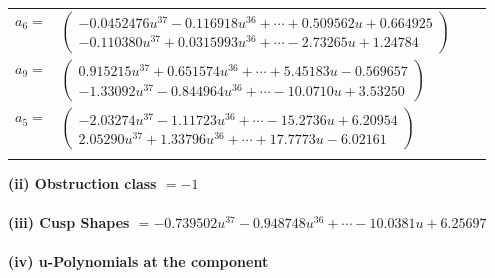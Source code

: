 \documentclass[1p]{elsarticle_modified}
\theoremstyle{definition}
\begin{document}
\begin{tabular}{m{7pt} m{180pt} m{7pt} m{180pt} }
\flushright $a_{6}=$&$\begin{pmatrix}-0.0452476 u^{37}-0.116918 u^{36}+\cdots+0.509562 u+0.664925\\-0.110380 u^{37}+0.0315993 u^{36}+\cdots-2.73265 u+1.24784\end{pmatrix}$ \\
\flushright $a_{9}=$&$\begin{pmatrix}0.915215 u^{37}+0.651574 u^{36}+\cdots+5.45183 u-0.569657\\-1.33092 u^{37}-0.844964 u^{36}+\cdots-10.0710 u+3.53250\end{pmatrix}$ \\
\flushright $a_{5}=$&$\begin{pmatrix}-2.03274 u^{37}-1.11723 u^{36}+\cdots-15.2736 u+6.20954\\2.05290 u^{37}+1.33796 u^{36}+\cdots+17.7773 u-6.02161\end{pmatrix}$\\&\end{tabular}
\flushleft \textbf{(ii) Obstruction class $= -1$}\\~\\
\flushleft \textbf{(iii) Cusp Shapes $= -0.739502 u^{37}-0.948748 u^{36}+\cdots-10.0381 u+6.25697$}\\~\\
\newpage\renewcommand{\arraystretch}{1}
\flushleft \textbf{(iv) u-Polynomials at the component}\newline \\
\end{document}
